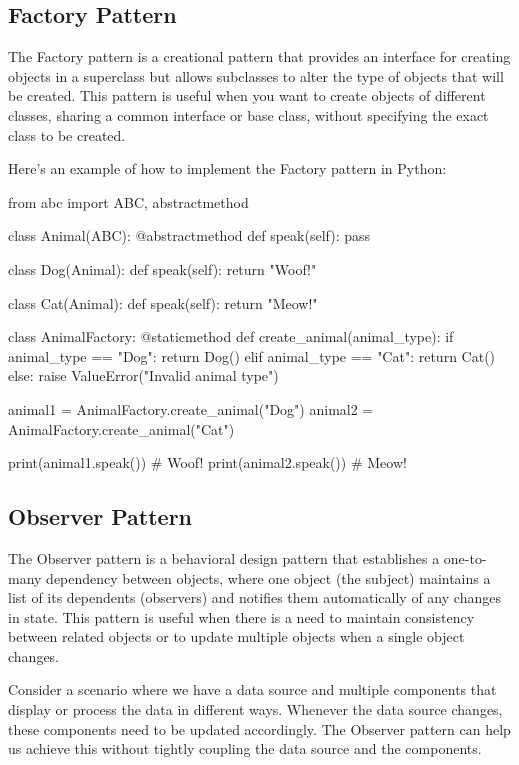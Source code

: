 \documentclass[12pt, a4paper, oneside, justified]{article}
\begin{document}
\subsection{Factory Pattern}
The Factory pattern is a creational pattern that provides an interface for creating objects in a
superclass but allows subclasses to alter the type of objects that will be created. This pattern is
useful when you want to create objects of different classes, sharing a common interface or base
class, without specifying the exact class to be created.

Here's an example of how to implement the Factory pattern in Python:
\begin{python}
    from abc import ABC, abstractmethod

    class Animal(ABC):
        @abstractmethod
        def speak(self):
            pass

    class Dog(Animal):
        def speak(self):
            return "Woof!"

    class Cat(Animal):
        def speak(self):
            return "Meow!"

    class AnimalFactory:
        @staticmethod
        def create_animal(animal_type):
            if animal_type == "Dog":
                return Dog()
            elif animal_type == "Cat":
                return Cat()
            else:
                raise ValueError("Invalid animal type")

    animal1 = AnimalFactory.create_animal("Dog")
    animal2 = AnimalFactory.create_animal("Cat")

    print(animal1.speak()) # Woof!
    print(animal2.speak()) # Meow!
\end{python}

\subsection{Observer Pattern}
The Observer pattern is a behavioral design pattern that establishes a one-to-many dependency
between objects, where one object (the subject) maintains a list of its dependents (observers) and
notifies them automatically of any changes in state. This pattern is useful when there is a need to
maintain consistency between related objects or to update multiple objects when a single object
changes.

Consider a scenario where we have a data source and multiple components that display or
process the data in different ways. Whenever the data source changes, these components need to
be updated accordingly. The Observer pattern can help us achieve this without tightly coupling
the data source and the components.
\end{document}
